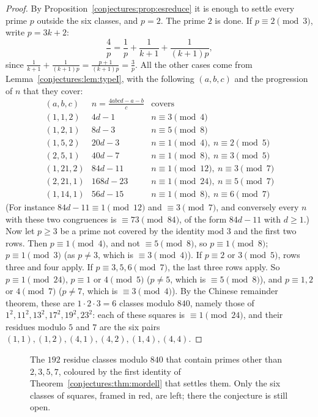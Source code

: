 \begin{proof}
By Proposition~\ref{conjectures:prop:esreduce} it is enough to settle every prime $p$ outside the six classes, and $p=2$. The prime $2$ is done. If $p\equiv2\pmod3$,
write $p=3k+2$:
\[
\frac4p=\frac1p+\frac1{k+1}+\frac1{(k+1)p},
\]
since $\frac1{k+1}+\frac1{(k+1)p}=\frac{p+1}{(k+1)p}=\frac3p$. All the other cases come from Lemma~\ref{conjectures:lem:typeI}, with the following $(a,b,c)$ and the
progression of $n$ that they cover:
\[
\begin{array}{lll}
(a,b,c)&n=\frac{4abcd-a-b}c&\text{covers}\\\hline
(1,1,2)&4d-1&n\equiv3\pmod4\\
(1,2,1)&8d-3&n\equiv5\pmod8\\
(1,5,2)&20d-3&n\equiv1\pmod4,\ n\equiv2\pmod5\\
(2,5,1)&40d-7&n\equiv1\pmod8,\ n\equiv3\pmod5\\
(1,21,2)&84d-11&n\equiv1\pmod{12},\ n\equiv3\pmod7\\
(2,21,1)&168d-23&n\equiv1\pmod{24},\ n\equiv5\pmod7\\
(1,14,1)&56d-15&n\equiv1\pmod8,\ n\equiv6\pmod7
\end{array}
\]
(For instance $84d-11\equiv1\pmod{12}$ and $\equiv3\pmod7$, and conversely every $n$ with these two congruences is $\equiv73\pmod{84}$, of the form
$84d-11$ with $d\ge1$.) Now let $p\ge3$ be a prime not covered by the identity mod $3$ and the first two rows. Then $p\equiv1\pmod4$, and not
$\equiv5\pmod8$, so $p\equiv1\pmod8$; $p\equiv1\pmod3$ (as $p\ne3$, which is $\equiv3\pmod4$). If $p\equiv2$ or $3\pmod5$, rows three and four apply. If
$p\equiv3,5,6\pmod7$, the last three rows apply. So $p\equiv1\pmod{24}$, $p\equiv1$ or $4\pmod5$ ($p\ne5$, which is $\equiv5\pmod8$), and $p\equiv1,2$ or
$4\pmod7$ ($p\ne7$, which is $\equiv3\pmod4$). By the Chinese remainder theorem, these are $1\cdot2\cdot3=6$ classes modulo $840$, namely those of
$1^2,11^2,13^2,17^2,19^2,23^2$: each of these squares is $\equiv1\pmod{24}$, and their residues modulo $5$ and $7$ are the six pairs
$(1,1),(1,2),(4,1),(4,2),(1,4),(4,4)$.
\end{proof}

\begin{figure}[ht]
\centering
{}
\caption{The $192$ residue classes modulo $840$ that contain primes other than $2,3,5,7$, coloured by the first identity of Theorem~\ref{conjectures:thm:mordell}
that settles them. Only the six classes of squares, framed in red, are left; there the conjecture is still open.}
\label{conjectures:fig:es}
\end{figure}

